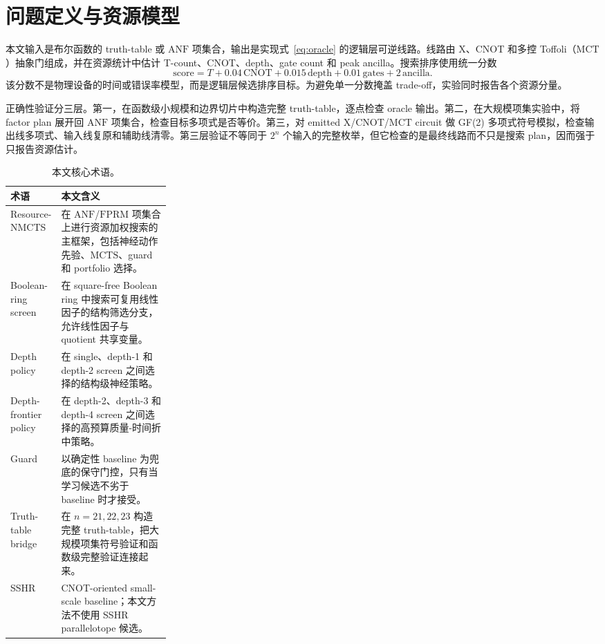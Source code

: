 \documentclass[UTF8,fontset=macnew,11pt]{ctexart}
\newcommand{\method}{Resource-NMCTS}
\newcommand{\screen}{Boolean-ring screen}
\newcommand{\anf}{\ensuremath{\mathrm{ANF}}}
\newcommand{\fprm}{\ensuremath{\mathrm{FPRM}}}
\newcommand{\mcts}{\ensuremath{\mathrm{MCTS}}}
\newcommand{\score}{\ensuremath{\mathrm{score}}}
\newcommand{\ttable}{truth-table}
\newcommand{\mct}{\ensuremath{\mathrm{MCT}}}
\begin{document}
\section{问题定义与资源模型}

本文输入是布尔函数的 \ttable{} 或 \anf{} 项集合，输出是实现式~\eqref{eq:oracle} 的逻辑层可逆线路。线路由 X、CNOT 和多控 Toffoli（\mct{}）抽象门组成，并在资源统计中估计 T-count、CNOT、depth、gate count 和 peak ancilla。搜索排序使用统一分数
\begin{equation}
  \score = T + 0.04\,\mathrm{CNOT} + 0.015\,\mathrm{depth}
         + 0.01\,\mathrm{gates} + 2\,\mathrm{ancilla}.
  \label{eq:score}
\end{equation}
该分数不是物理设备的时间或错误率模型，而是逻辑层候选排序目标。为避免单一分数掩盖 trade-off，实验同时报告各个资源分量。

正确性验证分三层。第一，在函数级小规模和边界切片中构造完整 \ttable{}，逐点检查 oracle 输出。第二，在大规模项集实验中，将 factor plan 展开回 \anf{} 项集合，检查目标多项式是否等价。第三，对 emitted X/CNOT/\mct{} circuit 做 GF(2) 多项式符号模拟，检查输出线多项式、输入线复原和辅助线清零。第三层验证不等同于 $2^n$ 个输入的完整枚举，但它检查的是最终线路而不只是搜索 plan，因而强于只报告资源估计。

\begin{table}[H]
\centering
\small
\caption{本文核心术语。}
\label{tab:terms}
\begin{tabularx}{\linewidth}{>{\raggedright\arraybackslash}p{0.27\linewidth}>{\raggedright\arraybackslash}X}
\toprule
术语 & 本文含义 \\
\midrule
\method{} & 在 \anf{}/\fprm{} 项集合上进行资源加权搜索的主框架，包括神经动作先验、\mcts{}、guard 和 portfolio 选择。 \\
\screen{} & 在 square-free Boolean ring 中搜索可复用线性因子的结构筛选分支，允许线性因子与 quotient 共享变量。 \\
Depth policy & 在 single、depth-1 和 depth-2 screen 之间选择的结构级神经策略。 \\
Depth-frontier policy & 在 depth-2、depth-3 和 depth-4 screen 之间选择的高预算质量-时间折中策略。 \\
Guard & 以确定性 baseline 为兜底的保守门控，只有当学习候选不劣于 baseline 时才接受。 \\
Truth-table bridge & 在 $n=21,22,23$ 构造完整 \ttable{}，把大规模项集符号验证和函数级完整验证连接起来。 \\
SSHR & CNOT-oriented small-scale baseline；本文方法不使用 SSHR parallelotope 候选。 \\
\bottomrule
\end{tabularx}
\end{table}
\end{document}
